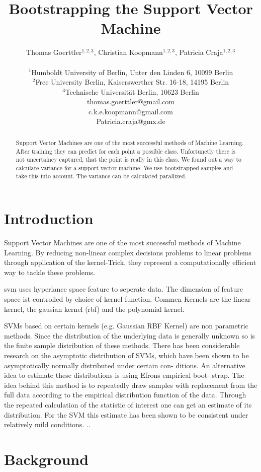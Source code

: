 \documentclass[letterpaper]{article}
\title{Bootstrapping the Support Vector Machine}
\author{Thomas Goerttler$^{1,2,3}$, Christian Koopmann$^{1,2,3}$, Patricia Craja$^{1,2,3}$ \\
\mbox{}\\
$^1$Humboldt University of Berlin, Unter den Linden 6, 10099 Berlin \\
$^2$Free University Berlin, Kaiserswerther Str. 16-18, 14195 Berlin \\
$^3$Technische Universität Berlin, 10623 Berlin \\
thomas.goerttler@gmail.com\\
c.k.e.koopmann@gmail.com\\
Patricia.craja@gmx.de\\
}
\begin{document}
\maketitle

\begin{abstract}
	Support Vector Machines are one of the most successful methods of Machine Learning. After training they can predict for each point a possible class. Unfortunetly there is not uncertaincy captured, that the point is really in this class. We found out a way to calculate variance for a support vector machine. We use bootstrapped samples and take this into account. The variance can be calculated parallized.
\end{abstract}

\section{Introduction}

Support Vector Machines are one of the most successful methods of Machine Learning. By reducing non-linear complex decisions problems to linear problems through application of the kernel-Trick, they represent a computationally efficient way to tackle these problems. 

svm uses hyperlance space feature to seperate data. The dimension of feature space ist controlled by choice of kernel function. Commen Kernels are the linear kernel, the gausian kernel (rbf) and the polynomial kernel.

SVMs based on certain kernels (e.g. Gaussian RBF Kernel) are non parametric methods. Since the distribution of the underlying data is generally unknown so is the finite sample distribution of these methods. 
There has been considerable research on the asymptotic distribution of SVMs, which have been shown to be asymptotically normally distributed under certain con- ditions. An alternative idea to estimate these distributions is using Efrons empirical boot- strap. The idea behind this method is to repeatedly draw samples with replacement from the full data according to the empirical distribution function of the data. Through the repeated calculation of the statistic of interest one can get an estimate of its distribution. For the SVM this estimate has been shown to be consistent under relatively mild conditions.
..
\section{Background}
\end{document}
